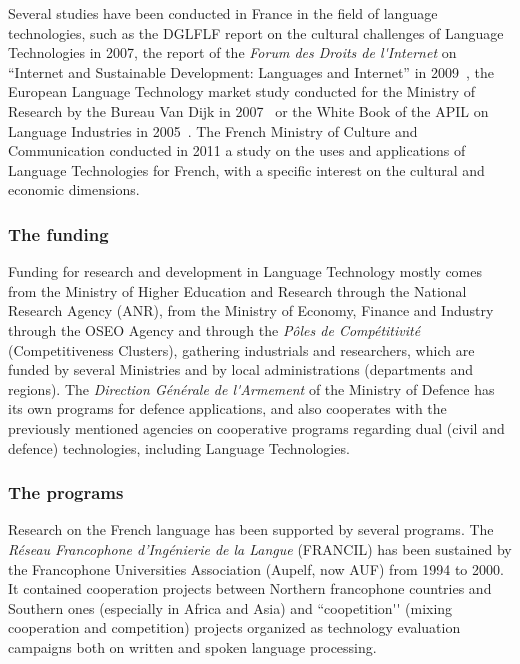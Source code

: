 \begin{multicols}{2}
Several studies have been conducted in France in the field of language
technologies, such as the DGLFLF report on the cultural challenges of
Language Technologies in 2007\cite{dglflf07}, the report of the {\em Forum des Droits de
l{\mbox '}Internet} on ``Internet and Sustainable Development: Languages and Internet'' in 2009~\cite{droitsinternet07}, the
European Language Technology market study conducted for the Ministry
of Research by the Bureau Van Dijk in 2007~\cite{vandijk07} or the White Book of the
APIL on Language Industries in 2005~\cite{apil05}. The French Ministry of Culture
and Communication conducted in 2011 a study on the uses and
applications of Language Technologies for French, with a specific
interest on the cultural and economic dimensions.

\subsubsection{The funding}
Funding for research and development in Language Technology mostly
comes from the Ministry of Higher Education and Research through the
National Research Agency (ANR), from the Ministry of Economy, Finance
and Industry through the OSEO Agency and through the {\em Pôles de
Compétitivité} (Competitiveness Clusters), gathering industrials and
researchers, which are funded by several Ministries and by local
administrations (departments and regions). The {\em Direction Générale de
l{\mbox '}Armement} of the Ministry of Defence has its own programs for defence
applications, and also cooperates with the previously mentioned
agencies on cooperative programs regarding dual (civil and defence)
technologies, including Language Technologies.

\subsubsection{The programs}
Research on the French language has been supported by several
programs. The {\em Réseau Francophone d’Ingénierie de la Langue} (FRANCIL)
has been sustained by the Francophone Universities Association
(Aupelf, now AUF) from 1994 to 2000. It contained cooperation projects
between Northern francophone countries and Southern ones (especially
in Africa and Asia) and ``coopetition{\mbox '}{\mbox '} (mixing cooperation and
competition) projects organized as technology evaluation campaigns
both on written and spoken language processing.


\end{multicols}
